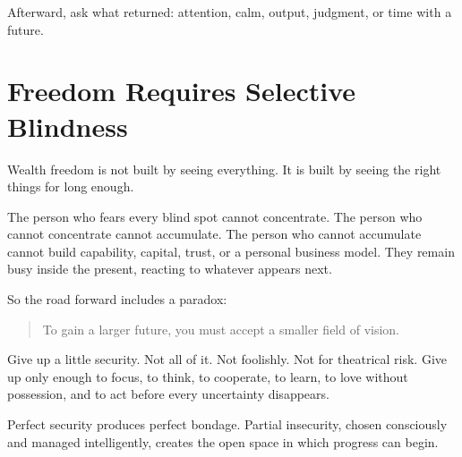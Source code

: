 Afterward, ask what returned: attention, calm, output, judgment, or time with a future.

\section*{Freedom Requires Selective Blindness}

Wealth freedom is not built by seeing everything. It is built by seeing the right things for long enough.

The person who fears every blind spot cannot concentrate. The person who cannot concentrate cannot accumulate. The person who cannot accumulate cannot build capability, capital, trust, or a personal business model. They remain busy inside the present, reacting to whatever appears next.

So the road forward includes a paradox:

\begin{quote}
To gain a larger future, you must accept a smaller field of vision.
\end{quote}

Give up a little security. Not all of it. Not foolishly. Not for theatrical risk. Give up only enough to focus, to think, to cooperate, to learn, to love without possession, and to act before every uncertainty disappears.

Perfect security produces perfect bondage. Partial insecurity, chosen consciously and managed intelligently, creates the open space in which progress can begin.
